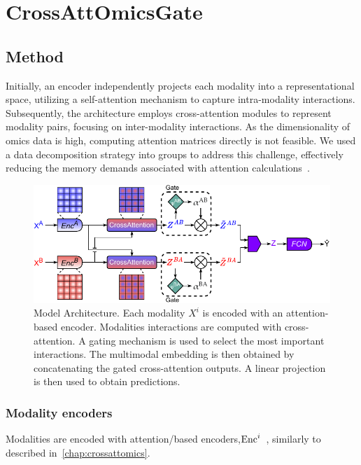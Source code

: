 \documentclass[../main.tex]{subfiles}
\begin{document}
\chapter{CrossAttOmicsGate}\label{chap:crossattomicsgate}
\minitocpage

\section{Method}
	Initially, an encoder independently projects each modality into a representational space, utilizing a self-attention mechanism to capture intra-modality interactions.
	Subsequently, the architecture employs cross-attention modules to represent modality pairs, focusing on inter-modality interactions.
	As the dimensionality of omics data is high, computing attention matrices directly is not feasible.
	We used a data decomposition strategy into groups to address this challenge, effectively reducing the memory demands associated with attention calculations~\cite{AttOmics}.

	\begin{figure}[htbp]
	  \centering
	  \includegraphics[width=\textwidth]{CrossAttOmicsGate.pdf}
	  \caption[CrossAttOmicsGate architecture]{Model Architecture. Each modality \(X^i\) is encoded with an attention-based encoder. Modalities interactions are computed with cross-attention. A gating mechanism is used to select the most important interactions. The multimodal embedding is then obtained by concatenating the gated cross-attention outputs. A linear projection is then used to obtain predictions.}
	  \label{fig:arch}
	\end{figure}

	\subsection{Modality encoders}
	  Modalities are encoded with attention\-/based encoders,\(\operatorname{Enc}^{i}\)~\cite{AttOmics}, similarly to  described in~\cref{chap:crossattomics}.
\end{document}
